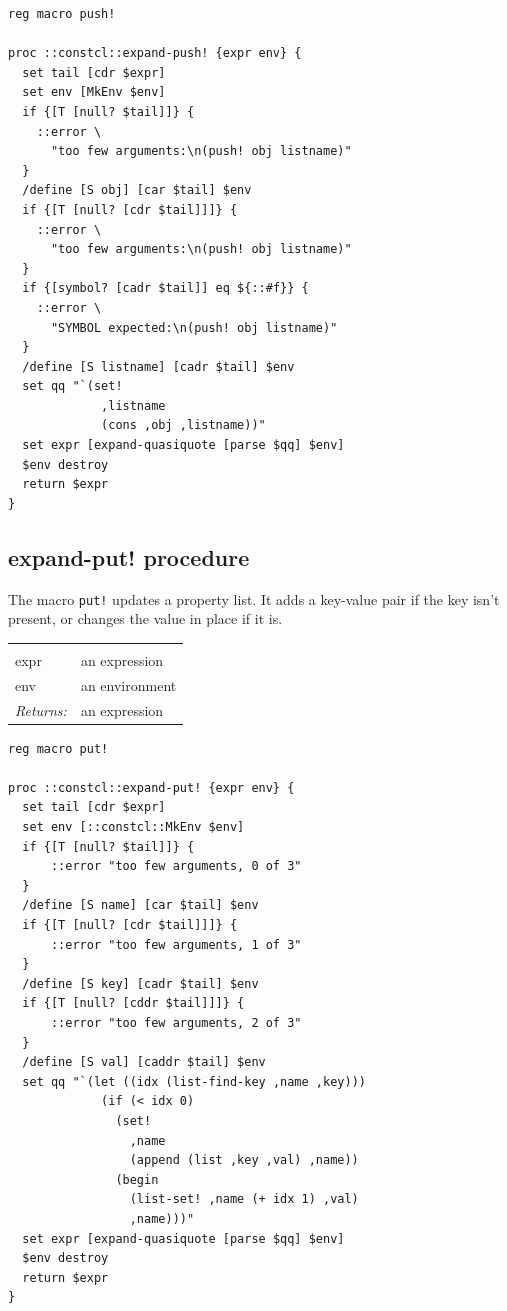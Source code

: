 \documentclass[twoside]{report}
\begin{document}
\begin{lstlisting}
reg macro push!

proc ::constcl::expand-push! {expr env} {
  set tail [cdr $expr]
  set env [MkEnv $env]
  if {[T [null? $tail]]} {
    ::error \
      "too few arguments:\n(push! obj listname)"
  }
  /define [S obj] [car $tail] $env
  if {[T [null? [cdr $tail]]]} {
    ::error \
      "too few arguments:\n(push! obj listname)"
  }
  if {[symbol? [cadr $tail]] eq ${::#f}} {
    ::error \
      "SYMBOL expected:\n(push! obj listname)"
  }
  /define [S listname] [cadr $tail] $env
  set qq "`(set!
             ,listname
             (cons ,obj ,listname))"
  set expr [expand-quasiquote [parse $qq] $env]
  $env destroy
  return $expr
}
\end{lstlisting}

\subsection{expand-put! procedure}
\label{expandput-procedure}

The macro \texttt{put!} updates a property list. It adds a key-value pair if the key isn't present, or changes the value in place if it is.

\noindent\begin{tabular}{ |p{1.9cm} p{8cm}| }
\hline
\rowcolor[HTML]{CCCCCC} \multicolumn{2}{|l|}{\bf expand-put! (internal)} \\
expr & an expression \\
env & an environment \\
\textit{Returns:} & an expression \\
\hline
\end{tabular}

\begin{lstlisting}
reg macro put!

proc ::constcl::expand-put! {expr env} {
  set tail [cdr $expr]
  set env [::constcl::MkEnv $env]
  if {[T [null? $tail]]} {
      ::error "too few arguments, 0 of 3"
  }
  /define [S name] [car $tail] $env
  if {[T [null? [cdr $tail]]]} {
      ::error "too few arguments, 1 of 3"
  }
  /define [S key] [cadr $tail] $env
  if {[T [null? [cddr $tail]]]} {
      ::error "too few arguments, 2 of 3"
  }
  /define [S val] [caddr $tail] $env
  set qq "`(let ((idx (list-find-key ,name ,key)))
             (if (< idx 0)
               (set!
                 ,name
                 (append (list ,key ,val) ,name))
               (begin
                 (list-set! ,name (+ idx 1) ,val)
                 ,name)))"
  set expr [expand-quasiquote [parse $qq] $env]
  $env destroy
  return $expr
}
\end{lstlisting}
\end{document}
